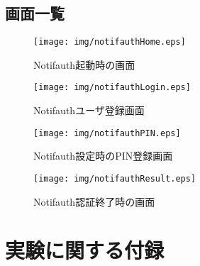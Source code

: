 \section{画面一覧}\label{apdx:screen}
\begin{figure}[ht]
  \begin{minipage}{0.5\hsize}
    \begin{center}
      \texttt{[image: img/notifauthHome.eps]}
    \end{center}
    \caption{Notifauth起動時の画面}
    \label{fig:notifauthHome}
  \end{minipage}
  \begin{minipage}{0.5\hsize}
    \begin{center}
      \texttt{[image: img/notifauthLogin.eps]}
    \end{center}
    \caption{Notifauthユーザ登録画面}
    \label{fig:notifauthLogin}
  \end{minipage}
\end{figure}

\begin{figure}[ht]
  \begin{minipage}{0.5\hsize}
    \begin{center}
      \texttt{[image: img/notifauthPIN.eps]}
    \end{center}
    \caption{Notifauth設定時のPIN登録画面}
    \label{fig:notifauthPIN}
  \end{minipage}
  \begin{minipage}{0.5\hsize}
    \begin{center}
      \texttt{[image: img/notifauthResult.eps]}
    \end{center}
    \caption{Notifauth認証終了時の画面}
    \label{fig:notifauthResult}
  \end{minipage}
\end{figure}

\chapter{実験に関する付録}\label{apdx:experiment}
